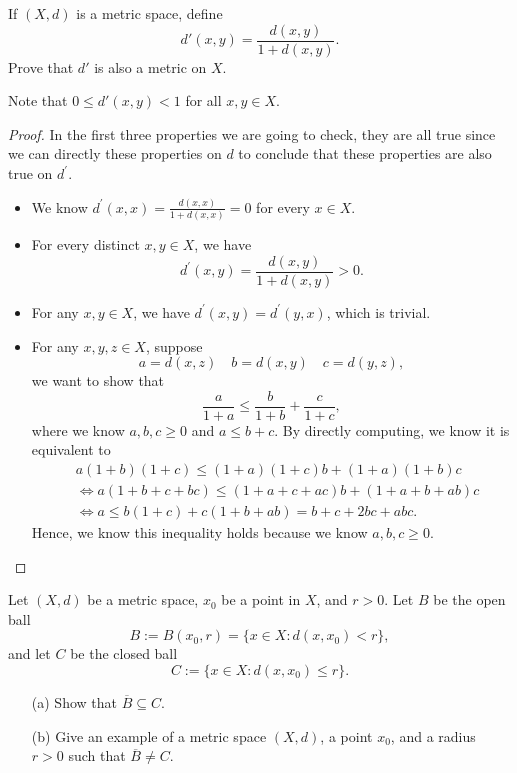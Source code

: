 \begin{problem}[11pts] \label{pr: 1}
    If $(X,d)$ is a metric space, define
\[
d'(x,y) = \frac{d(x,y)}{1 + d(x,y)}.
\]
Prove that $d'$ is also a metric on $X$. 

\noindent
Note that $0 \leq d'(x,y) < 1$ for all $x,y \in X$.
\end{problem}
\begin{proof}
    In the first three properties we are going to check, they are all true since we can directly these properties on \(d\) to conclude that these properties are also true on \(d^{\prime} \).  
    \begin{itemize}
        \item We know \(d^{\prime} (x, x) = \frac{d(x, x)}{1 + d(x, x)} = 0\) for every \(x \in X\). 
        \item For every distinct \(x, y \in X\), we have 
        \[
            d^{\prime} (x, y) = \frac{d(x, y)}{1 + d(x, y)} > 0.
        \]
        \item For any \(x, y \in X\), we have \(d^{\prime} (x, y) = d^{\prime} (y,x)\), which is trivial.  
        \item For any \(x,y,z \in X\), suppose
        \[
            a = d(x,z) \quad b = d(x, y) \quad c=d(y,z),
        \]
        we want to show that 
        \[
            \frac{a}{1+a} \le \frac{b}{1+b} + \frac{c}{1+c},
        \] where we know \(a,b,c \ge 0\) and \(a \le b + c\). By directly computing, we know it is equivalent to
        \begin{align*}
          &a(1+b)(1+c) \le (1+a)(1+c)b + (1+a)(1+b)c \\
          &\iff a(1 + b + c + bc) \le (1 + a + c + ac)b + (1 + a + b + ab)c \\
          &\iff a \le b(1+c) + c(1+b+ab) = b + c + 2bc + abc.
        \end{align*}
        Hence, we know this inequality holds because we know \(a,b,c \ge 0\). 
    \end{itemize}
\end{proof}
\begin{problem}
  Let $(X,d)$ be a metric space, $x_0$ be a point in $X$, and $r>0$. Let $B$ be the open ball
\[
B := B(x_0,r) = \{ x \in X : d(x,x_0) < r \},
\]
and let $C$ be the closed ball
\[
C := \{ x \in X : d(x,x_0) \leq r \}.
\]

\begin{enumerate}
  \item[(a)] Show that $\overline{B} \subseteq C$.
  \item[(b)] Give an example of a metric space $(X,d)$, a point $x_0$, and a radius $r>0$ such that $\overline{B} \neq C$.
\end{enumerate}
  
\end{problem}
